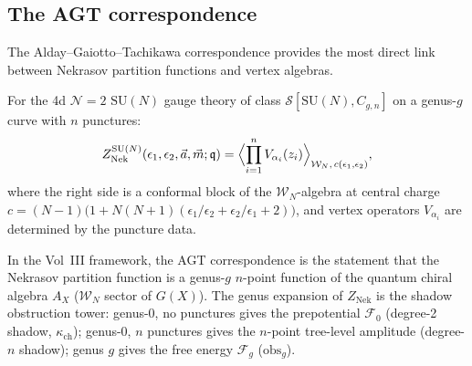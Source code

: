 \subsection{The AGT correspondence}
\label{subsec:phys-agt}

The Alday--Gaiotto--Tachikawa correspondence provides the most direct link
between Nekrasov partition functions and vertex algebras.

\begin{theorem}
\label{thm:phys-agt}
For the 4d $\mathcal{N}=2$ $\mathrm{SU}(N)$ gauge theory of class
$\mathcal{S}[\mathrm{SU}(N), C_{g,n}]$ on a genus-$g$ curve with $n$
punctures:
\begin{equation}\label{eq:phys-agt}
 Z_{\mathrm{Nek}}^{\mathrm{SU}(N)}(\epsilon_1, \epsilon_2, \vec{a}, \vec{m}; \mathfrak{q})
 = \Bigl\langle \prod_{i=1}^n V_{\alpha_i}(z_i) \Bigr\rangle_{\mathcal{W}_N,\,c(\epsilon_1,\epsilon_2)},
\end{equation}
where the right side is a conformal block of the $\mathcal{W}_N$-algebra at
central charge
$c = (N-1)\bigl(1 + N(N+1)(\epsilon_1/\epsilon_2 + \epsilon_2/\epsilon_1 + 2)\bigr)$,
and vertex operators $V_{\alpha_i}$ are determined by the puncture data.
\end{theorem}

In the Vol~III framework, the AGT correspondence is the statement that the
Nekrasov partition function is a genus-$g$ $n$-point function of the quantum
chiral algebra $A_X$ ($\mathcal{W}_N$ sector of $G(X)$). The genus expansion
of $Z_{\mathrm{Nek}}$ is the shadow obstruction tower: genus-0, no punctures
gives the prepotential $\mathcal{F}_0$ (degree-2 shadow, $\kappa_{\mathrm{ch}}$);
genus-0, $n$ punctures gives the $n$-point tree-level amplitude (degree-$n$
shadow); genus $g$ gives the free energy $\mathcal{F}_g$ ($\mathrm{obs}_g$).

